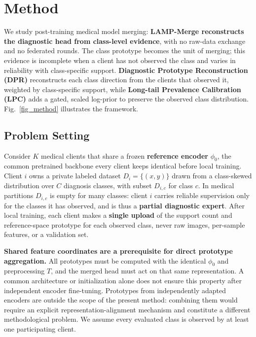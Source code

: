 \documentclass[journal,twoside,web]{ieeecolor}
\begin{document}
\section{Method}
We study post-training medical model merging: \textbf{LAMP-Merge reconstructs the diagnostic head from class-level evidence}, with no raw-data exchange and no federated rounds. The class prototype becomes the unit of merging; this evidence is incomplete when a client has not observed the class and varies in reliability with class-specific support. \textbf{Diagnostic Prototype Reconstruction (DPR)} reconstructs each class direction from the clients that observed it, weighted by class-specific support, while \textbf{Long-tail Prevalence Calibration (LPC)} adds a gated, scaled log-prior to preserve the observed class distribution. Fig.~\ref{fig_method} illustrates the framework.


\subsection{Problem Setting}

Consider $K$ medical clients that share a frozen \textbf{reference encoder} $\phi_0$, the common pretrained backbone every client keeps identical before local training. Client $i$ owns a private labeled dataset $D_i=\{(x,y)\}$ drawn from a class-skewed distribution over $C$ diagnosis classes, with subset $D_{i,c}$ for class $c$. In medical partitions $D_{i,c}$ is empty for many classes: client $i$ carries reliable supervision only for the classes it has observed, and is thus a \textbf{partial diagnostic expert}. After local training, each client makes a \textbf{single upload} of the support count and reference-space prototype for each observed class, never raw images, per-sample features, or a validation set.

\textbf{Shared feature coordinates are a prerequisite for direct prototype aggregation.} All prototypes must be computed with the identical $\phi_0$ and preprocessing $T$, and the merged head must act on that same representation. A common architecture or initialization alone does not ensure this property after independent encoder fine-tuning. Prototypes from independently adapted encoders are outside the scope of the present method: combining them would require an explicit representation-alignment mechanism and constitute a different methodological problem. We assume every evaluated class is observed by at least one participating client.
\end{document}

